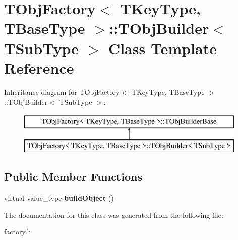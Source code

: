 \hypertarget{class_t_obj_factory_1_1_t_obj_builder}{\section{T\+Obj\+Factory$<$ T\+Key\+Type, T\+Base\+Type $>$\+:\+:T\+Obj\+Builder$<$ T\+Sub\+Type $>$ Class Template Reference}
\label{class_t_obj_factory_1_1_t_obj_builder}
}
Inheritance diagram for T\+Obj\+Factory$<$ T\+Key\+Type, T\+Base\+Type $>$\+:\+:T\+Obj\+Builder$<$ T\+Sub\+Type $>$\+:\begin{figure}[H]
\begin{center}
\leavevmode
\includegraphics[height=2.000000cm]{class_t_obj_factory_1_1_t_obj_builder}
\end{center}
\end{figure}
\subsection*{Public Member Functions}
\begin{DoxyCompactItemize}
\item 
\hypertarget{class_t_obj_factory_1_1_t_obj_builder_af61a223cc838c2551a904c50ec9a06c6}{virtual value\+\_\+type {\bfseries build\+Object} ()}\label{class_t_obj_factory_1_1_t_obj_builder_af61a223cc838c2551a904c50ec9a06c6}

\end{DoxyCompactItemize}


The documentation for this class was generated from the following file\+:\begin{DoxyCompactItemize}
\item 
factory.\+h\end{DoxyCompactItemize}
